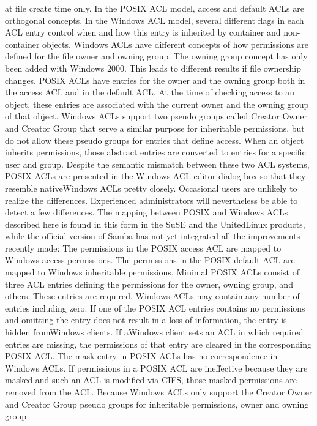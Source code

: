 at file create time only.
 In the POSIX ACL model, access and default ACLs
are orthogonal concepts. In the Windows ACL
model, several different flags in each ACL entry
control when and how this entry is inherited by container
and non-container objects.
 Windows ACLs have different concepts of how permissions
are defined for the file owner and owning
group. The owning group concept has only been
added with Windows 2000. This leads to different
results if file ownership changes.
 POSIX ACLs have entries for the owner and the
owning group both in the access ACL and in the
default ACL. At the time of checking access to an
object, these entries are associated with the current
owner and the owning group of that object. Windows
ACLs support two pseudo groups called Creator
Owner and Creator Group that serve a similar
purpose for inheritable permissions, but do not allow
these pseudo groups for entries that define access.
When an object inherits permissions, those
abstract entries are converted to entries for a specific
user and group.
Despite the semantic mismatch between these two
ACL systems, POSIX ACLs are presented in the Windows
ACL editor dialog box so that they resemble nativeWindows
ACLs pretty closely. Occasional users are
unlikely to realize the differences. Experienced administrators
will nevertheless be able to detect a few differences.
The mapping between POSIX and Windows
ACLs described here is found in this form in the SuSE
and the UnitedLinux products, while the official version
of Samba has not yet integrated all the improvements recently
made:
 The permissions in the POSIX access ACL are
mapped to Windows access permissions. The permissions
in the POSIX default ACL are mapped to
Windows inheritable permissions.
 Minimal POSIX ACLs consist of three ACL entries
defining the permissions for the owner, owning
group, and others. These entries are required.
Windows ACLs may contain any number of entries
including zero. If one of the POSIX ACL entries
contains no permissions and omitting the entry does
not result in a loss of information, the entry is hidden
fromWindows clients. If aWindows client sets
an ACL in which required entries are missing, the
permissions of that entry are cleared in the corresponding
POSIX ACL.
 The mask entry in POSIX ACLs has no correspondence
in Windows ACLs. If permissions in
a POSIX ACL are ineffective because they are
masked and such an ACL is modified via CIFS,
those masked permissions are removed from the
ACL.
 Because Windows ACLs only support the Creator
Owner and Creator Group pseudo groups for
inheritable permissions, owner and owning group
